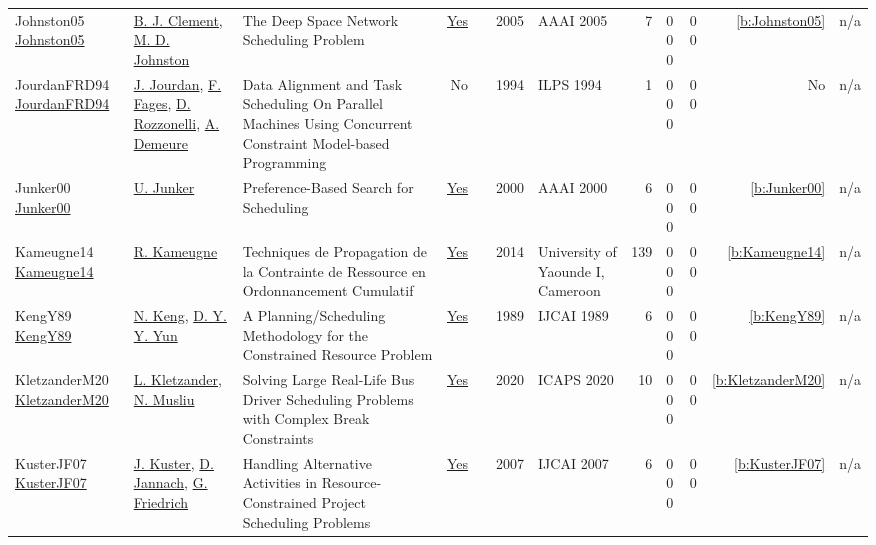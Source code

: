 {\begin{longtable}{>{\raggedright\arraybackslash}p{3cm}>{\raggedright\arraybackslash}p{4.5cm}>{\raggedright\arraybackslash}p{6.0cm}rrrp{2.5cm}rp{1cm}p{1cm}rr}
Johnston05 \href{}{Johnston05} & \hyperref[auth:a1342]{B. J. Clement}, \hyperref[auth:a1212]{M. D. Johnston} & The Deep Space Network Scheduling Problem & \href{../works/Johnston05.pdf}{Yes} & \cite{Johnston05} & 2005 & AAAI 2005 & 7 & 0 0 0 & 0 0 & \ref{b:Johnston05} & n/a\\
JourdanFRD94 \href{}{JourdanFRD94} & \hyperref[auth:a697]{J. Jourdan}, \hyperref[auth:a698]{F. Fages}, \hyperref[auth:a699]{D. Rozzonelli}, \hyperref[auth:a700]{A. Demeure} & Data Alignment and Task Scheduling On Parallel Machines Using Concurrent Constraint Model-based Programming & No & \cite{JourdanFRD94} & 1994 & ILPS 1994 & 1 & 0 0 0 & 0 0 & No & n/a\\
Junker00 \href{http://www.aaai.org/Library/AAAI/2000/aaai00-139.php}{Junker00} & \hyperref[auth:a1327]{U. Junker} & Preference-Based Search for Scheduling & \href{../works/Junker00.pdf}{Yes} & \cite{Junker00} & 2000 & AAAI 2000 & 6 & 0 0 0 & 0 0 & \ref{b:Junker00} & n/a\\
Kameugne14 \href{http://cp2013.a4cp.org/sites/default/files/roger_kameugne_-_propagation_techniques_of_resource_constraint_for_cumulative_scheduling.pdf}{Kameugne14} & \hyperref[auth:a10]{R. Kameugne} & Techniques de Propagation de la Contrainte de Ressource en Ordonnancement Cumulatif & \href{../works/Kameugne14.pdf}{Yes} & \cite{Kameugne14} & 2014 & University of Yaounde I, Cameroon & 139 & 0 0 0 & 0 0 & \ref{b:Kameugne14} & n/a\\
KengY89 \href{http://ijcai.org/Proceedings/89-2/Papers/024.pdf}{KengY89} & \hyperref[auth:a1438]{N. Keng}, \hyperref[auth:a1439]{D. Y. Y. Yun} & A Planning/Scheduling Methodology for the Constrained Resource Problem & \href{../works/KengY89.pdf}{Yes} & \cite{KengY89} & 1989 & IJCAI 1989 & 6 & 0 0 0 & 0 0 & \ref{b:KengY89} & n/a\\
KletzanderM20 \href{https://ojs.aaai.org/index.php/ICAPS/article/view/6688}{KletzanderM20} & \hyperref[auth:a78]{L. Kletzander}, \hyperref[auth:a45]{N. Musliu} & Solving Large Real-Life Bus Driver Scheduling Problems with Complex Break Constraints & \href{../works/KletzanderM20.pdf}{Yes} & \cite{KletzanderM20} & 2020 & ICAPS 2020 & 10 & 0 0 0 & 0 0 & \ref{b:KletzanderM20} & n/a\\
KusterJF07 \href{http://ijcai.org/Proceedings/07/Papers/316.pdf}{KusterJF07} & \hyperref[auth:a1446]{J. Kuster}, \hyperref[auth:a1447]{D. Jannach}, \hyperref[auth:a602]{G. Friedrich} & Handling Alternative Activities in Resource-Constrained Project Scheduling Problems & \href{../works/KusterJF07.pdf}{Yes} & \cite{KusterJF07} & 2007 & IJCAI 2007 & 6 & 0 0 0 & 0 0 & \ref{b:KusterJF07} & n/a\\

\end{longtable}}
